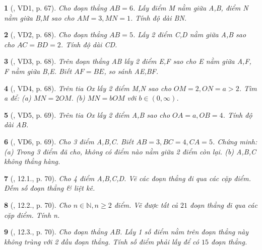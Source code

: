 \documentclass{article}
\newtheorem{baitoan}{}
\begin{document}
\begin{baitoan}[\cite{Binh_boi_duong_Toan_6_tap_2}, VD1, p. 67]
	Cho đoạn thẳng $AB = 6$. Lấy điểm M nằm giữa A,B, điểm N nằm giữa B,M sao cho $AM = 3,MN = 1$. Tính độ dài BN.
\end{baitoan}

\begin{baitoan}[\cite{Binh_boi_duong_Toan_6_tap_2}, VD2, p. 68]
	Cho đoạn thẳng $AB = 5$. Lấy 2 điểm C,D nằm giữa A,B sao cho $AC = BD = 2$. Tính độ dài CD.
\end{baitoan}

\begin{baitoan}[\cite{Binh_boi_duong_Toan_6_tap_2}, VD3, p. 68]
	Trên đoạn thẳng AB lấy 2 điểm E,F sao cho E nằm giữa A,F, F nằm giữa B,E. Biết $AF = BE$, so sánh AE,BF.
\end{baitoan}

\begin{baitoan}[\cite{Binh_boi_duong_Toan_6_tap_2}, VD4, p. 68]
	Trên tia Ox lấy 2 điểm M,N sao cho $OM = 2,ON = a > 2$. Tìm a để: (a) $MN = 2OM$. (b) $MN = bOM$ với $b\in(0,\infty)$.
\end{baitoan}

\begin{baitoan}[\cite{Binh_boi_duong_Toan_6_tap_2}, VD5, p. 69]
	Trên tia Ox lấy 2 điểm A,B sao cho $OA = a,OB = 4$. Tính độ dài AB.
\end{baitoan}

\begin{baitoan}[\cite{Binh_boi_duong_Toan_6_tap_2}, VD6, p. 69]
	Cho 3 điểm A,B,C. Biết $AB = 3,BC = 4,CA = 5$. Chứng minh: (a) Trong 3 điểm đã cho, không có điểm nào nằm giữa 2 điểm còn lại. (b) A,B,C không thẳng hàng.
\end{baitoan}

\begin{baitoan}[\cite{Binh_boi_duong_Toan_6_tap_2}, 12.1., p. 70]
	Cho 4 điểm A,B,C,D. Vẽ các đoạn thẳng đi qua các cặp điểm. Đếm số đoạn thẳng \& liệt kê.
\end{baitoan}

\begin{baitoan}[\cite{Binh_boi_duong_Toan_6_tap_2}, 12.2., p. 70]
	Cho $n\in\mathbb{N},n\ge2$ điểm. Vẽ được tất cả $21$ đoạn thẳng đi qua các cặp điểm. Tính n.
\end{baitoan}

\begin{baitoan}[\cite{Binh_boi_duong_Toan_6_tap_2}, 12.3., p. 70]
	Cho đoạn thẳng AB. Lấy 1 số điểm nằm trên đoạn thẳng này không trùng với 2 đầu đoạn thẳng. Tính số điểm phải lấy để có $15$ đoạn thẳng.
\end{baitoan}
\end{document}
